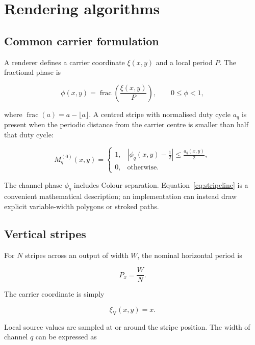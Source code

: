\section{Rendering algorithms}

\subsection{Common carrier formulation}

A renderer defines a carrier coordinate $\xi(x,y)$ and a local period $P$. The fractional phase is

\begin{equation}
\phi(x,y)=\operatorname{frac}\!\left(\frac{\xi(x,y)}{P}\right),
\qquad 0\le\phi<1,
\label{eq:phase}
\end{equation}

where $\operatorname{frac}(a)=a-\lfloor a\rfloor$. A centred stripe with normalised duty cycle $a_q$ is present when the periodic distance from the carrier centre is smaller than half that duty cycle:

\begin{equation}
M_q^{(0)}(x,y)=
\begin{cases}
1,&\left|\phi_q(x,y)-\frac{1}{2}\right|\le \frac{a_q(x,y)}{2},\\[1mm]
0,&\text{otherwise.}
\end{cases}
\label{eq:stripeline}
\end{equation}

The channel phase $\phi_q$ includes Colour separation. Equation~\eqref{eq:stripeline} is a convenient mathematical description; an implementation can instead draw explicit variable-width polygons or stroked paths.

\subsection{Vertical stripes}

For $N$ stripes across an output of width $W$, the nominal horizontal period is

\begin{equation}
P_x=\frac{W}{N}.
\label{eq:verticalperiod}
\end{equation}

The carrier coordinate is simply

\begin{equation}
\xi_{\mathrm{V}}(x,y)=x.
\end{equation}

Local source values are sampled at or around the stripe position. The width of channel $q$ can be expressed as

